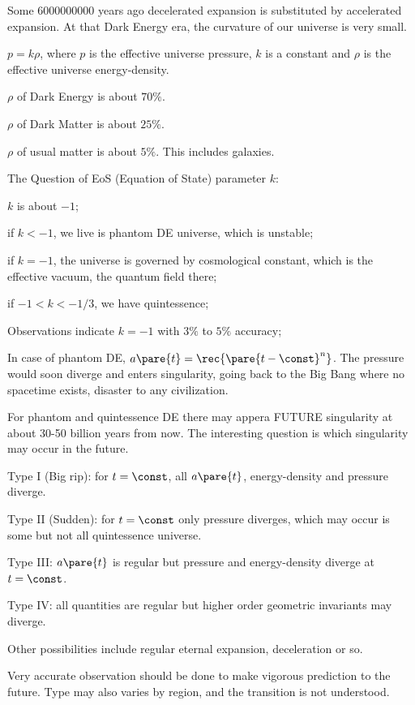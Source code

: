 \documentclass{ctexart}
\begin{document}
Some 6000000000 years ago decelerated expansion is substituted by accelerated expansion. At that Dark Energy era, the curvature of our universe is very small.
\begin{cenum}
    \item $p = k\rho$, where $p$ is the effective universe pressure, $k$ is a constant and $\rho$ is the effective universe energy-density.
    \item $\rho$ of Dark Energy is about $70\%$.
    \item $\rho$ of Dark Matter is about $25\%$.
    \item $\rho$ of usual matter is about $5\%$. This includes galaxies.
\end{cenum}
The Question of EoS (Equation of State) parameter $k$:
\begin{cenum}
    \item $k$ is about $-1$;
    \item if $k<-1$, we live is phantom DE universe, which is unstable;
    \item if $k=-1$, the universe is governed by cosmological constant, which is the effective vacuum, the quantum field there;
    \item if $-1 < k < -1/3$, we have quintessence;
    \item Observations indicate $k=-1$ with $3\%$ to $5\%$ accuracy;
    \item In case of phantom DE, $a\pare{t} = \displaystyle \rec{\pare{t-\const}^n}$. The pressure would soon diverge and enters singularity, going back to the Big Bang where no spacetime exists, disaster to any civilization.
\end{cenum}
For phantom and quintessence DE there may appera FUTURE singularity at about 30-50 billion years from now. The interesting question is which singularity may occur in the future.
\begin{cenum}
    \item Type I (Big rip): for $t = \const$, all $a\pare{t}$, energy-density and pressure diverge.
    \item Type II (Sudden): for $t = \const$ only pressure diverges, which may occur is some but not all quintessence universe.
    \item Type III: $a\pare{t}$ is regular but pressure and energy-density diverge at $t=\const$.
    \item Type IV: all quantities are regular but higher order geometric invariants may diverge.
    \item Other possibilities include regular eternal expansion, deceleration or so.
\end{cenum}
Very accurate observation should be done to make vigorous prediction to the future. Type may also varies by region, and the transition is not understood.
\end{document}

